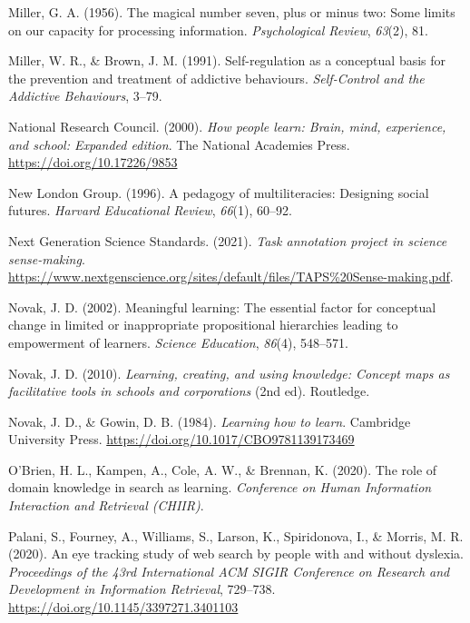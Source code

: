 \documentclass[letterpaper, nobind]{templates/ociamthesis}
\newlength{\cslhangindent}
\newenvironment{CSLReferences}[2] %
 {%
  \setlength{\parindent}{0pt}
  \ifodd #1
  \let\oldpar\par
  \def\par{\hangindent=\cslhangindent\oldpar}
  \fi
  \setlength{\parskip}{1mm}
  \setlength{\baselineskip}{6mm}
 }%
 {}
\begin{document}
\begin{CSLReferences}{1}{0}
\leavevmode{}%
Miller, G. A. (1956). The magical number seven, plus or minus two: Some limits on our capacity for processing information. \emph{Psychological Review}, \emph{63}(2), 81.

\leavevmode{}%
Miller, W. R., \& Brown, J. M. (1991). Self-regulation as a conceptual basis for the prevention and treatment of addictive behaviours. \emph{Self-Control and the Addictive Behaviours}, 3--79.

\leavevmode{}%
National Research Council. (2000). \emph{How people learn: {Brain}, mind, experience, and school: {Expanded} edition}. {The National Academies Press}. \url{https://doi.org/10.17226/9853}

\leavevmode{}%
New London Group. (1996). A pedagogy of multiliteracies: Designing social futures. \emph{Harvard Educational Review}, \emph{66}(1), 60--92.

\leavevmode{}%
Next Generation Science Standards. (2021). \emph{Task annotation project in science \textbar{} sense-making}. \url{https://www.nextgenscience.org/sites/default/files/TAPS\%20Sense-making.pdf}.

\leavevmode{}%
Novak, J. D. (2002). Meaningful learning: The essential factor for conceptual change in limited or inappropriate propositional hierarchies leading to empowerment of learners. \emph{Science Education}, \emph{86}(4), 548--571.

\leavevmode{}%
Novak, J. D. (2010). \emph{Learning, creating, and using knowledge: Concept maps as facilitative tools in schools and corporations} (2nd ed). {Routledge}.

\leavevmode{}%
Novak, J. D., \& Gowin, D. B. (1984). \emph{Learning how to learn}. Cambridge University Press. \url{https://doi.org/10.1017/CBO9781139173469}

\leavevmode{}%
O'Brien, H. L., Kampen, A., Cole, A. W., \& Brennan, K. (2020). The role of domain knowledge in search as learning. \emph{Conference on Human Information Interaction and Retrieval (CHIIR)}.

\leavevmode{}%
Palani, S., Fourney, A., Williams, S., Larson, K., Spiridonova, I., \& Morris, M. R. (2020). An eye tracking study of web search by people with and without dyslexia. \emph{Proceedings of the 43rd International ACM SIGIR Conference on Research and Development in Information Retrieval}, 729--738. \url{https://doi.org/10.1145/3397271.3401103}


\end{CSLReferences}
\end{document}
